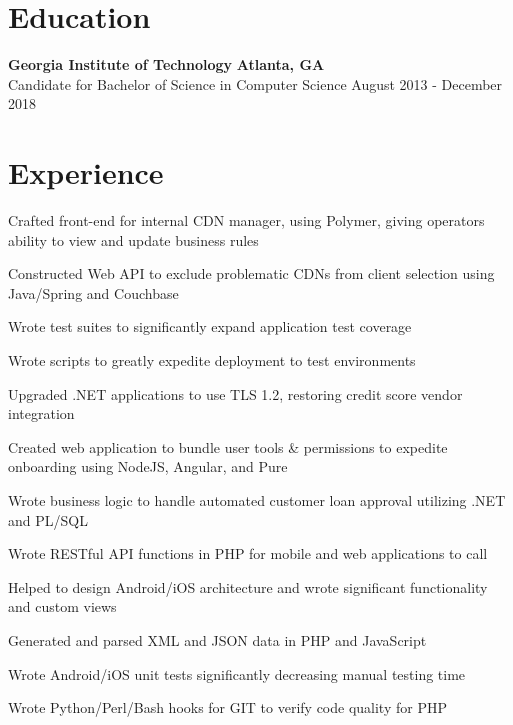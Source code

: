 \documentclass[line]{resume}
\begin{document}
\begin{center}
\end{center}
\section{Education}
\textbf{Georgia Institute of Technology} \hfill \textbf{Atlanta, GA} \\
Candidate for Bachelor of Science in Computer Science  \hfill August 2013 - December 2018
\section{Experience}
\begin{myitemize}
	\item Crafted front-end for internal CDN manager, using Polymer, giving operators ability to view and update business rules
	\item Constructed Web API to exclude problematic CDNs from client selection using Java/Spring and Couchbase
	\item Wrote test suites to significantly expand application test coverage
\end{myitemize}

\begin{myitemize}
	\item Wrote scripts to greatly expedite deployment to test environments
	\item Upgraded .NET applications to use TLS 1.2, restoring credit score vendor integration
	\item Created web application to bundle user tools \& permissions to expedite onboarding using NodeJS, Angular, and Pure
	\item Wrote business logic to handle automated customer loan approval utilizing .NET and PL/SQL
\end{myitemize}

\begin{myitemize}
	\item Wrote RESTful API functions in PHP for mobile and web applications to call 
	\item Helped to design Android/iOS architecture and wrote significant functionality and custom views
	\item Generated and parsed XML and JSON data in PHP and JavaScript 
	\item Wrote Android/iOS unit tests significantly decreasing manual testing time 
	\item Wrote Python/Perl/Bash hooks for GIT to verify code quality for PHP
\end{myitemize}
\end{document}
